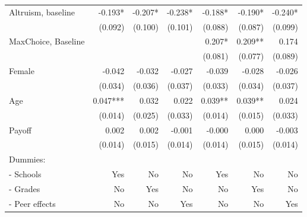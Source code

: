 \begin{table}[htbp]
\begin{adjustbox}{width=1\textwidth}
\begin{threeparttable}
\begin{tabular}{l*{6}{D{.}{.}{-1}}}
Altruism, baseline  &              -0.193*  &              -0.207*  &              -0.238*  &              -0.188*  &              -0.190*  &              -0.240*  \\
                    &             (0.092)   &             (0.100)   &             (0.101)   &             (0.088)   &             (0.087)   &             (0.099)   \\
MaxChoice, Baseline &                       &                       &                       &               0.207*  &               0.209** &               0.174   \\
                    &                       &                       &                       &             (0.081)   &             (0.077)   &             (0.089)   \\
Female              &              -0.042   &              -0.032   &              -0.027   &              -0.039   &              -0.028   &              -0.026   \\
                    &             (0.034)   &             (0.036)   &             (0.037)   &             (0.033)   &             (0.034)   &             (0.037)   \\
Age                 &               0.047***&               0.032   &               0.022   &               0.039** &               0.039** &               0.024   \\
                    &             (0.014)   &             (0.025)   &             (0.033)   &             (0.014)   &             (0.015)   &             (0.033)   \\
Payoff              &               0.002   &               0.002   &              -0.001   &              -0.000   &               0.000   &              -0.003   \\
                    &             (0.014)   &             (0.015)   &             (0.014)   &             (0.014)   &             (0.015)   &             (0.014)   \\ \midrule 
Dummies: &&&&&& \\
- Schools             &                 Yes   &                  No   &                  No   &                 Yes   &                  No   &                  No   \\
- Grades              &                  No   &                 Yes   &                  No   &                  No   &                 Yes   &                  No   \\
- Peer effects        &                  No   &                  No   &                 Yes   &                  No   &                  No   &                 Yes   \\

\end{tabular}
\end{threeparttable}
\end{adjustbox}
\end{table}
